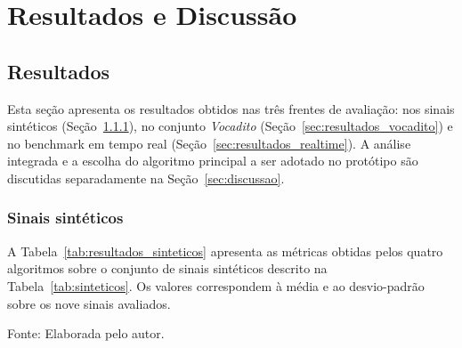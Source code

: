 \chapter{\label{chap:resultados}Resultados e Discussão}

  \section{Resultados}
  \label{sec:resultados}

  Esta seção apresenta os resultados obtidos nas três frentes de avaliação: nos
  sinais sintéticos (Seção~\ref{sec:resultados_sinteticos}), no conjunto
  \textit{Vocadito} (Seção~\ref{sec:resultados_vocadito}) e no benchmark em
  tempo real (Seção~\ref{sec:resultados_realtime}). A análise integrada e a
  escolha do algoritmo principal a ser adotado no protótipo são discutidas
  separadamente na Seção~\ref{sec:discussao}.

  \subsection{Sinais sintéticos}
  \label{sec:resultados_sinteticos}

  A Tabela~\ref{tab:resultados_sinteticos} apresenta as métricas obtidas pelos
  quatro algoritmos sobre o conjunto de sinais sintéticos descrito na
  Tabela~\ref{tab:sinteticos}. Os valores correspondem à média e ao desvio-padrão sobre os
  nove sinais avaliados.

  \begin{table}[H]
  \centering
  \caption{\label{tab:resultados_sinteticos}Resultados agregados sobre os sinais sintéticos. Os valores são apresentados como média $\pm$ desvio-padrão sobre os nove sinais. As setas indicam o sentido
  desejado: $\uparrow$ maior é melhor; $\downarrow$ menor é melhor.}
  \small Fonte: Elaborada pelo autor.
\end{table}

